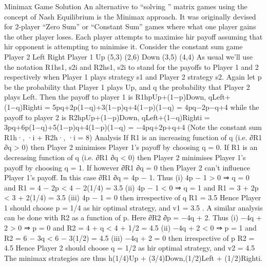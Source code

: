 Minimax Game Solution
An alternative to “solving ” matrix games using the concept of Nash Equilibrium is the
Minimax approach. It was originally devised for 2-player “Zero Sum” or “Constant Sum”
games where what one player gains the other player loses. Each player attempts to maximise
hir payoff assuming that hir opponent is attempting to minimise it.
Consider the constant sum game
Player 2
Left Right
Player 1 Up (5,3) (2,6)
Down (3,5) (4,4)
As usual we’ll use the notation R1hs1, s2i and R2hs1, s2i to stand for the payoffs to Player
1 and 2 respectively when Player 1 plays strategy s1 and Player 2 strategy s2. Again let p
be the probability that Player 1 plays Up, and q the probability that Player 2 plays Left.
Then the payoff to player 1 is
R1hpUp+(1−p)Down, qLeft+(1−q)Righti = 5pq+2p(1−q)+3(1−p)q+4(1−p)(1−q) = 4pq−2p−q+4
while the payoff to player 2 is
R2hpUp+(1−p)Down, qLeft+(1−q)Righti = 3pq+6p(1−q)+5(1−p)q+4(1−p)(1−q) = −4pq+2p+q+4
(Note the constant sum R1h·, ·i + R2h·, ·i = 8)
Analysis
If R1 is an increasing function of q (i.e. ∂R1
∂q > 0) then Player 2 minimises Player 1’s
payoff by choosing q = 0. If R1 is an decreasing function of q (i.e. ∂R1
∂q < 0) then Player
2 minimises Player 1’s payoff by choosing q = 1. If however ∂R1
∂q = 0 then Player 2 can’t
influence Player 1’s payoff.
In this case ∂R1
∂q = 4p − 1. Thus
(i) 4p − 1 > 0 ⇒ q = 0 and
R1 = 4 − 2p < 4 − 2(1/4) = 3.5
(ii) 4p − 1 < 0 ⇒ q = 1 and
R1 = 3 + 2p < 3 + 2(1/4) = 3.5
(iii) 4p − 1 = 0 then irrespective of q
R1 = 3.5
Hence Player 1 should choose p = 1/4 as hir optimal strategy, and v1 = 3.5 .
A similar analysis can be done with R2 as a function of p. Here ∂R2
∂p = −4q + 2. Thus
(i) −4q + 2 > 0 ⇒ p = 0 and
R2 = 4 + q < 4 + 1/2 = 4.5
(ii) −4q + 2 < 0 ⇒ p = 1 and
R2 = 6 − 3q < 6 − 3(1/2) = 4.5
(iii) −4q + 2 = 0 then irrespective of p
R2 = 4.5
Hence Player 2 should choose q = 1/2 as hir optimal strategy, and v2 = 4.5
The minimax strategies are thus h(1/4)Up + (3/4)Down,(1/2)Left + (1/2)Righti.

